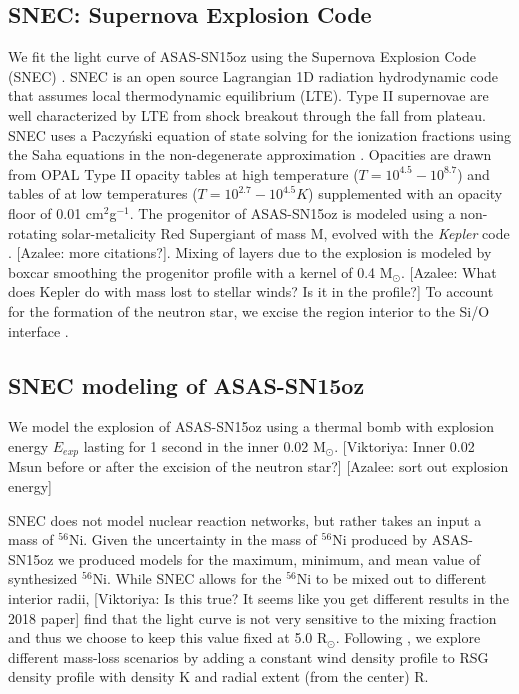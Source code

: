 \documentclass[preprint]{aastex61}
\newcommand{\azaleecomment}[1]{{\color{red} [{#1}]}}
\newcommand{\Azalee}[1]{\azaleecomment{Azalee: #1}}
\newcommand{\viktoriyacomment}[1]{{\color{blue} [{#1}]}}
\newcommand{\Viktoriya}[1]{\viktoriyacomment{Viktoriya: #1}}
\newcommand{\msunperiod}{M$_{\odot}$}
\begin{document}
\subsection{SNEC: Supernova Explosion Code}
We fit the light curve of ASAS-SN15oz using the Supernova Explosion Code (SNEC) \citep{2015morozova}.
SNEC is an open source Lagrangian 1D radiation hydrodynamic code that assumes local thermodynamic equilibrium (LTE).
Type II supernovae are well characterized by LTE from shock breakout through the fall from plateau. 
SNEC uses a Paczy\'nski equation of state \citep{1983paczynski} solving for the ionization fractions using the Saha equations in the non-degenerate approximation \citep{2000zaghloul}. 
Opacities are drawn from OPAL Type II opacity tables \citep{1996iglesias} at high temperature ($T=10^{4.5}-10^{8.7}$) and tables of \citet{2005ferguson} at low temperatures ($T = 10^{2.7}-10^{4.5}K$) supplemented with an opacity floor of 0.01 cm$^2$g$^{-1}$. 
The progenitor of ASAS-SN15oz is modeled using a non-rotating solar-metalicity Red Supergiant of mass M, evolved with the {\it Kepler} code \citep{2016sukhbold}. 
\Azalee{more citations?}. 
Mixing of layers due to the explosion is modeled by boxcar smoothing the progenitor profile with a kernel of 0.4 \msunperiod.
\Azalee{What does Kepler do with mass lost to stellar winds? Is it in the profile?}
To account for the formation of the neutron star, we excise the region interior to the Si/O interface \citep{2018morozova}. 
\subsection{SNEC modeling of ASAS-SN15oz}\label{sec:LCmodeling}
We model the explosion of ASAS-SN15oz using a thermal bomb with explosion energy $E_{exp}$ lasting for 1 second in the inner 0.02 \msunperiod. 
\Viktoriya{Inner 0.02 Msun before or after the excision of the neutron star?}
\Azalee{sort out explosion energy}

SNEC does not model nuclear reaction networks, but rather takes an input a mass of ${}^{56}$Ni. 
Given the uncertainty in the mass of ${}^{56}$Ni produced by ASAS-SN15oz we produced models for the maximum, minimum, and mean value of synthesized ${}^{56}$Ni.
While SNEC allows for the ${}^{56}$Ni to be mixed out to different interior radii, \Viktoriya{Is this true? It seems like you get different results in the 2018 paper} find that the light curve is not very sensitive to the mixing fraction and thus we choose to keep this value fixed at 5.0 R$_{\odot}$. 
Following \citet{2017morozova}, we explore different mass-loss scenarios by adding a constant wind density profile to RSG density profile with density K and radial extent (from the center) R.
\end{document}
